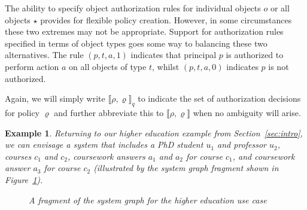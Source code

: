 \documentclass{article}
\newcommand{\interestahead}{*}
\newcommand{\interestdhead}{square}
\newcommand{\semantics}[1]{\llbracket #1 \rrbracket}
\newtheorem{example}{Example}
\begin{document}
The ability to specify object authorization rules for individual objects $o$ or all objects $\star$ provides for flexible policy creation.
However, in some circumstances these two extremes may not be appropriate.
Support for authorization rules specified in terms of object types goes some way to balancing these two alternatives.
The rule $(p,t,a,1)$ indicates that principal $p$ is authorized to perform action $a$ on all objects of type $t$, whilst $(p,t,a,0)$ indicates $p$ is not authorized.

Again, we will simply write $\semantics{\rho,\varrho}_q$ to indicate the set of authorization decisions for policy $\varrho$ and further abbreviate this to $\semantics{\rho,\varrho}$ when no ambiguity will arise.

\begin{example}\label{ex:higher-education-1}
Returning to our higher education example from Section~\ref{sec:intro}, we can envisage a system that includes a PhD student $u_1$ and professor $u_2$, courses $c_1$ and $c_2$, coursework answers $a_1$ and $a_2$ for course $c_1$, and coursework answer $a_3$ for course $c_2$ (illustrated by the system graph fragment shown in Figure~\ref{img:he-system-graph-fragment}).

\begin{figure}[!ht]\centering\setlength{\extrarowheight}{2pt}
      \caption{A fragment of the system graph for the higher education use case}\label{img:he-system-graph-fragment}
\end{figure}


\end{example}
\end{document}
